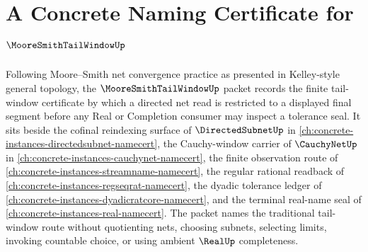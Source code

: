 \chapter{A Concrete Naming Certificate for $\MooreSmithTailWindowUp$}
\label{ch:concrete-instances-moore-smith-tail-window-namecert}

Following Moore--Smith net convergence practice as presented in Kelley-style general topology, the $\MooreSmithTailWindowUp$ packet records the finite tail-window certificate by which a directed net read is restricted to a displayed final segment before any Real or Completion consumer may inspect a tolerance seal. It sits beside the cofinal reindexing surface of $\DirectedSubnetUp$ in \autoref{ch:concrete-instances-directedsubnet-namecert}, the Cauchy-window carrier of $\CauchyNetUp$ in \autoref{ch:concrete-instances-cauchynet-namecert}, the finite observation route of \autoref{ch:concrete-instances-streamname-namecert}, the regular rational readback of \autoref{ch:concrete-instances-regseqrat-namecert}, the dyadic tolerance ledger of \autoref{ch:concrete-instances-dyadicratcore-namecert}, and the terminal real-name seal of \autoref{ch:concrete-instances-real-namecert}. The packet names the traditional tail-window route without quotienting nets, choosing subnets, selecting limits, invoking countable choice, or using ambient $\RealUp$ completeness.

